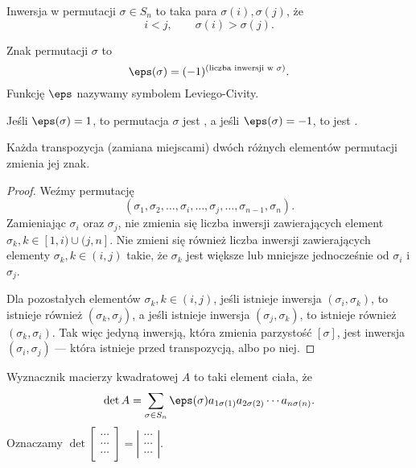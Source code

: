 \begin{definition}
    Inwersja w permutacji $\sigma \in S_n$ to taka para $\sigma(i), \sigma(j)$, że
    \[ i < j, \qquad \sigma(i) > \sigma(j). \]
\end{definition}

\begin{definition}
    Znak permutacji $\sigma$ to
    \[ \eps(\sigma) = (-1)^{(\text{liczba inwersji w } \sigma)}. \]
    Funkcję $\eps$ nazywamy symbolem Leviego-Civity.
\end{definition}

Jeśli $\eps(\sigma) = 1$, to permutacja $\sigma$ jest , a jeśli  $\eps(\sigma) = -1$, to jest .

\begin{fact}
    \label{f:sign of transposition}
    Każda transpozycja (zamiana miejscami) dwóch różnych elementów permutacji zmienia jej znak.
\end{fact}
\begin{proof}
    Weźmy permutację
    \[ (\sigma_1, \sigma_2, \ldots, \sigma_i, \ldots, \sigma_j, \ldots, \sigma_{n-1}, \sigma_n). \]
    Zamieniając $\sigma_i$ oraz $\sigma_j$, nie zmienia się liczba inwersji zawierających element $\sigma_k, k \in [1,i)\cup(j,n]$. Nie zmieni się również liczba inwersji zawierających elementy $\sigma_k, k \in (i,j)$ takie, że $\sigma_k$ jest większe lub mniejsze jednocześnie od $\sigma_i$ i $\sigma_j$.

    Dla pozostałych elementów $\sigma_k, k \in (i, j)$, jeśli istnieje inwersja $(\sigma_i, \sigma_k)$, to istnieje również $(\sigma_k, \sigma_j)$, a jeśli istnieje inwersja $(\sigma_j, \sigma_k)$, to istnieje również $(\sigma_k, \sigma_i)$. Tak więc jedyną inwersją, która zmienia parzystość $[\sigma]$, jest inwersja $(\sigma_i, \sigma_j)$ --- która istnieje przed transpozycją, albo po niej.
\end{proof}

\begin{definition}
    \label{d:determinant}
    Wyznacznik macierzy kwadratowej $A$ to taki element ciała, że
    \[ \det A = \sum_{\sigma\in S_n} \eps(\sigma)a_{1\sigma(1)}a_{2\sigma(2)}\cdots a_{n\sigma(n)}. \]
    Oznaczamy $\det
    \left[\begin{smallmatrix}
        \cdots \\ \cdots \\ \cdots
    \end{smallmatrix}\right] =
    \left|\begin{smallmatrix}
        \cdots \\ \cdots \\ \cdots
    \end{smallmatrix}\right|$.
\end{definition}

